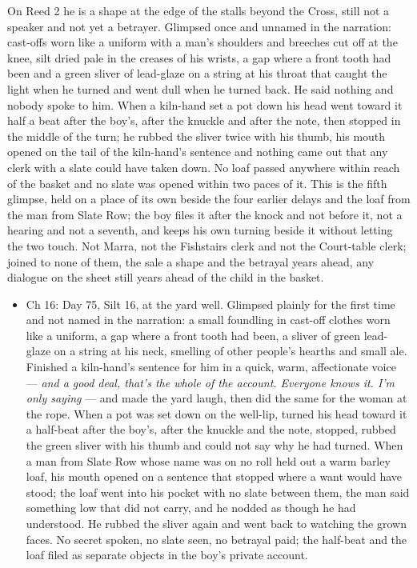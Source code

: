 \documentclass{design/chronicle}
\begin{document}
{On Reed 2 he is a shape at the edge of the stalls beyond the Cross, still not a speaker and not yet a betrayer. Glimpsed once and unnamed in the narration: cast-offs worn like a uniform with a man’s shoulders and breeches cut off at the knee, silt dried pale in the creases of his wrists, a gap where a front tooth had been and a green sliver of lead-glaze on a string at his throat that caught the light when he turned and went dull when he turned back. He said nothing and nobody spoke to him. When a kiln-hand set a pot down his head went toward it half a beat after the boy’s, after the knuckle and after the note, then stopped in the middle of the turn; he rubbed the sliver twice with his thumb, his mouth opened on the tail of the kiln-hand’s sentence and nothing came out that any clerk with a slate could have taken down. No loaf passed anywhere within reach of the basket and no slate was opened within two paces of it. This is the fifth glimpse, held on a place of its own beside the four earlier delays and the loaf from the man from Slate Row; the boy files it after the knock and not before it, not a hearing and not a seventh, and keeps his own turning beside it without letting the two touch. Not Marra, not the Fishstairs clerk and not the Court-table clerk; joined to none of them, the sale a shape and the betrayal years ahead, any dialogue on the sheet still years ahead of the child in the basket.

\begin{itemize}[leftmargin=1.4em,itemsep=1pt,topsep=3pt,parsep=0pt]

\item Ch 16: Day 75, Silt 16, at the yard well. Glimpsed plainly for the first time and not named in the narration: a small foundling in cast-off clothes worn like a uniform, a gap where a front tooth had been, a sliver of green lead-glaze on a string at his neck, smelling of other people’s hearths and small ale. Finished a kiln-hand’s sentence for him in a quick, warm, affectionate voice --- \emph{and a good deal, that’s the whole of the account. Everyone knows it. I’m only saying} --- and made the yard laugh, then did the same for the woman at the rope. When a pot was set down on the well-lip, turned his head toward it a half-beat after the boy’s, after the knuckle and the note, stopped, rubbed the green sliver with his thumb and could not say why he had turned. When a man from Slate Row whose name was on no roll held out a warm barley loaf, his mouth opened on a sentence that stopped where a want would have stood; the loaf went into his pocket with no slate between them, the man said something low that did not carry, and he nodded as though he had understood. He rubbed the sliver again and went back to watching the grown faces. No secret spoken, no slate seen, no betrayal paid; the half-beat and the loaf filed as separate objects in the boy’s private account.


\end{itemize}}
\end{document}
